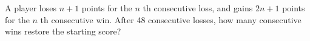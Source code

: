 A player loses $ n+1 $ points for the $ n $ th consecutive loss, and gains $ 2n+1 $ points for the $ n $ th consecutive win. After 48 consecutive losses, how many consecutive wins restore the starting score?
